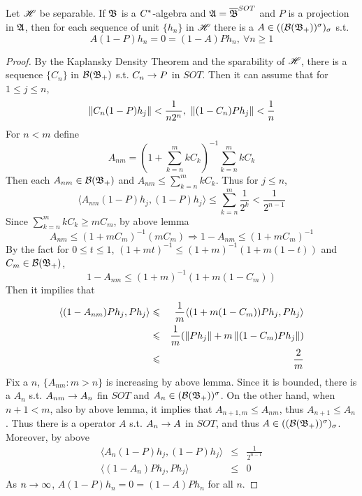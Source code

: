 \begin{lem}
	Let $\mathscr{H}$ be separable. If $\mathfrak{B}$ is a $C^{*}$-algebra and $\mathfrak{A} = \overline{\mathfrak{B}}^{SOT}$ and $P$ is a projection in $\mathfrak{A}$, then for each sequence of unit $\{h_n\}$ in $\mathscr{H}$ there is a $A \in ((\mathcal{B}(\mathfrak{B}_+))^{\sigma})_{\sigma}$ s.t.
	\begin{equation*}
		A(1-P)h_n = 0  = (1-A)Ph_n,~ \forall  n \geqslant 1
	\end{equation*}
\end{lem}
\begin{proof}
	By the Kaplansky Density Theorem and the sparability of $\mathscr{H}$, there is a sequence $\{C_n\}$ in $\mathcal{B}(\mathfrak{B}_+)$ s.t. $C_n \rightarrow P$ in $SOT$. Then it can assume that for $1 \leqslant j \leqslant  n$,
	\begin{equation*}
		\left\lVert C_n(1-P)h_j\right\lVert < \frac{1}{n2^n},~ \left\lVert(1-C_n)Ph_j\right\lVert < \frac{1}{n}
	\end{equation*}
	For $n < m$ define
	\begin{equation*}
		A_{nm} = \left(1+ \sum_{k=n}^m kC_k \right)^{-1}\sum_{k=n}^m kC_k
	\end{equation*}
	Then each $A_{nm} \in \mathcal{B}(\mathfrak{B}_+)$ and $A_{nm} \leqslant \sum_{k=n}^m kC_k$. Thus for $j \leqslant n$,
	\begin{equation*}
		\langle A_{nm}(1-P)h_j, (1-P)h_j \rangle \leqslant \sum_{k=n}^m \frac{1}{2^k} < \frac{1}{2^{n-1}}
	\end{equation*}
	Since $\sum_{k=n}^m kC_k \geqslant mC_m$, by above lemma
	\begin{equation*}
		A_{nm} \leqslant (1+mC_m)^{-1} (mC_m) \Rightarrow 1-A_{nm} \leqslant (1+mC_m)^{-1}
	\end{equation*}
	By the fact for $0 \leqslant t \leqslant 1$, $(1+mt)^{-1} \leqslant (1+m)^{-1}(1+m(1-t))$ and $C_m \in \mathcal{B}(\mathfrak{B}_+)$, 
	\begin{equation*}
		1- A_{nm} \leqslant (1+m)^{-1}(1+m(1-C_m))
	\end{equation*}
	Then it impilies that
	\begin{eqnarray*}
		\langle (1-A_{nm})Ph_j,Ph_j \rangle &\leqslant& \frac{1}{m} \langle (1+m(1-C_m))Ph_j,Ph_j \rangle \\
		&\leqslant& \frac{1}{m} (\left\lVert Ph_j\right\lVert+m\left\lVert(1-C_m)Ph_j\right\lVert) \\
		&\leqslant& \frac{2}{m}
	\end{eqnarray*}
	Fix a $n$, $\{A_{nm} \colon m > n\}$ is increasing by above lemma. Since it is bounded, there is a $A_n$  s.t. $A_{nm} \rightarrow A_n$ fin $SOT$ and $A_n \in (\mathcal{B}(\mathfrak{B}_+))^{\sigma}$. On the other hand, when $n+1 < m$, also by above lemma, it implies that $A_{n+1,m} \leqslant A_{nm}$, thus $A_{n+1} \leqslant A_n$. Thus there is a operator $A$ s.t. $A_n \rightarrow A$ in $SOT$, and thus $A \in ((\mathcal{B}(\mathfrak{B}_+))^{\sigma})_{\sigma}$. Moreover, by above
	\begin{eqnarray*}
		\langle A_n(1-P)h_j, (1-P)h_j \rangle &\leqslant& \frac{1}{2^{n-1}} \\
		\langle (1-A_n)Ph_j,Ph_j \rangle &\leqslant& 0
	\end{eqnarray*}
	As $n \rightarrow \infty$, $A(1-P)h_n = 0  = (1-A)Ph_n$ for all $n$.
\end{proof}

